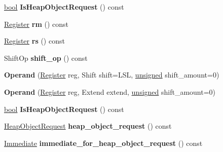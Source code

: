 \begin{DoxyCompactItemize}
\mbox{\hyperlink{classbool}{bool}} {\bfseries Is\+Heap\+Object\+Request} () const
\item 
\mbox{\label{classv8_1_1internal_1_1Operand_ad0495c31017fd74b04574225b3af4d39}} 
\mbox{\hyperlink{classv8_1_1internal_1_1Register}{Register}} {\bfseries rm} () const
\item 
\mbox{\label{classv8_1_1internal_1_1Operand_a65326562f2205395b86359b8f80cc804}} 
\mbox{\hyperlink{classv8_1_1internal_1_1Register}{Register}} {\bfseries rs} () const
\item 
\mbox{\label{classv8_1_1internal_1_1Operand_ab6360936c1ec6ab289c1a2fe3b9d9191}} 
Shift\+Op {\bfseries shift\+\_\+op} () const
\item 
\mbox{\label{classv8_1_1internal_1_1Operand_a1af963dd843b63c0c2aaa9ccd339c47f}} 
{\bfseries Operand} (\mbox{\hyperlink{classv8_1_1internal_1_1Register}{Register}} reg, Shift shift=L\+SL, \mbox{\hyperlink{classunsigned}{unsigned}} shift\+\_\+amount=0)
\item 
\mbox{\label{classv8_1_1internal_1_1Operand_aae672cf521d2681ac927432410638373}} 
{\bfseries Operand} (\mbox{\hyperlink{classv8_1_1internal_1_1Register}{Register}} reg, Extend extend, \mbox{\hyperlink{classunsigned}{unsigned}} shift\+\_\+amount=0)
\item 
\mbox{\label{classv8_1_1internal_1_1Operand_adc7ce8d04bde8ab9674a1bdc9689e5ee}} 
\mbox{\hyperlink{classbool}{bool}} {\bfseries Is\+Heap\+Object\+Request} () const
\item 
\mbox{\label{classv8_1_1internal_1_1Operand_a9beaf04cfc4aea3a9d725172753766ed}} 
\mbox{\hyperlink{classv8_1_1internal_1_1HeapObjectRequest}{Heap\+Object\+Request}} {\bfseries heap\+\_\+object\+\_\+request} () const
\item 
\mbox{\label{classv8_1_1internal_1_1Operand_a88c99f7cbc3dbe691728270bf58d3e8b}} 
\mbox{\hyperlink{classv8_1_1internal_1_1Immediate}{Immediate}} {\bfseries immediate\+\_\+for\+\_\+heap\+\_\+object\+\_\+request} () const

\end{DoxyCompactItemize}
